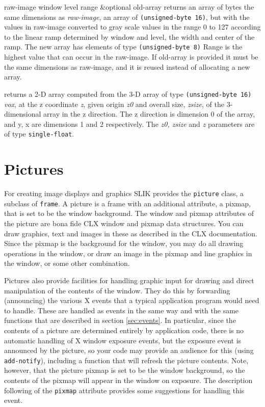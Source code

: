 \documentclass[twoside,openright,11pt]{report}
\newcommand{\tp}[1]{\texttt{#1}}
\begin{document}
{raw-image window level range \&optional old-array}
{returns an array of bytes the same dimensions as \emph{raw-image}, an
array of \tp{(unsigned-byte 16)}, but with the values in raw-image
converted to gray scale values in the range 0 to 127 according to the
linear ramp determined by window and level, the width and center of
the ramp.  The new array has elements of type \tp{(unsigned-byte
8)} Range is the highest value that can occur in the raw-image.  If
old-array is provided it must be the same dimensions as raw-image, and
it is reused instead of allocating a new array.}

{returns a 2-D array computed from the 3-D array of type
\tp{(unsigned-byte~16)} \emph{vox}, at the z coordinate \emph{z},
given origin \emph{z0} and overall size, \emph{zsize}, of the
3-dimensional array in the z direction.  The z direction is dimension
0 of the array, and y, x are dimensions 1 and 2 respectively.  The
\emph{z0, zsize} and \emph{z} parameters are of type
\tp{single-float}.}

\section{Pictures} \label{sec:picture}

For creating image displays and graphics SLIK provides the
\tp{picture} class, a subclass of \tp{frame}.  A
picture is a frame with an additional attribute, a
pixmap, that is set to be the window background.  The window and
pixmap attributes of the picture are bona fide CLX window and pixmap
data structures.  You can draw graphics, text and images in these as
described in the CLX documentation.  Since the pixmap is the
background for the window, you may do all drawing operations in the
window, or draw an image in the pixmap and line graphics in the
window, or some other combination.

Pictures also provide facilities for handling graphic input for
drawing and direct manipulation of the contents of the window.  They
do this by forwarding (announcing) the various X events that a typical
application program would need to handle.  These are handled as events
in the same way and with the same functions that are described in
section \ref{sec:events}.  In particular, since the contents of a
picture are determined entirely by application code, there is no
automatic handling of X window exposure events, but the exposure event
is announced by the picture, so your code may provide an audience for
this (using \tp{add-notify}), including a function that will
refresh the picture contents.  Note, however, that the picture pixmap
is set to be the window background, so the contents of the pixmap will
appear in the window on exposure.  The description following of the
\tp{pixmap} attribute provides some suggestions for handling this
event.
\end{document}

